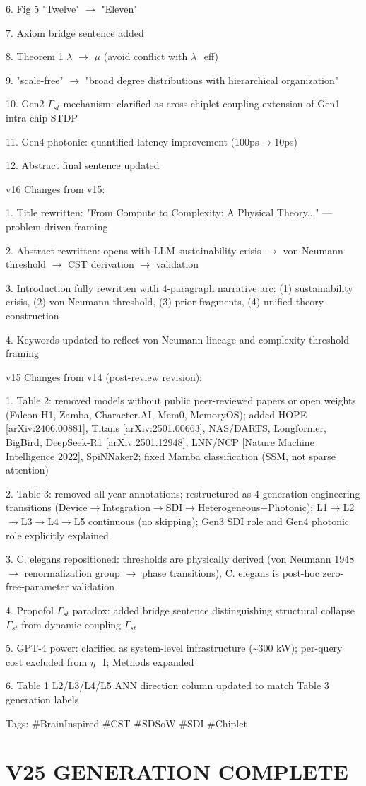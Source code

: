 \documentclass[a4paper,12pt]{article}
\begin{document}
6. Fig 5 "Twelve" $\rightarrow$ "Eleven"

7. Axiom bridge sentence added

8. Theorem 1 $\lambda$ $\rightarrow$ $\mu$ (avoid conflict with $\lambda$\_eff)

9. "scale-free" $\rightarrow$ "broad degree distributions with hierarchical organization"

10. Gen2 $\Gamma_{st}$ mechanism: clarified as cross-chiplet coupling extension of Gen1 intra-chip STDP

11. Gen4 photonic: quantified latency improvement (100ps$\rightarrow$10ps)

12. Abstract final sentence updated

v16 Changes from v15:

1. Title rewritten: "From Compute to Complexity: A Physical Theory..." --- problem-driven framing

2. Abstract rewritten: opens with LLM sustainability crisis $\rightarrow$ von Neumann threshold $\rightarrow$ CST derivation $\rightarrow$ validation

3. Introduction fully rewritten with 4-paragraph narrative arc: (1) sustainability crisis, (2) von Neumann threshold, (3) prior fragments, (4) unified theory construction

4. Keywords updated to reflect von Neumann lineage and complexity threshold framing

v15 Changes from v14 (post-review revision):

1. Table 2: removed models without public peer-reviewed papers or open weights (Falcon-H1, Zamba, Character.AI, Mem0, MemoryOS); added HOPE [arXiv:2406.00881], Titans [arXiv:2501.00663], NAS/DARTS, Longformer, BigBird, DeepSeek-R1 [arXiv:2501.12948], LNN/NCP [Nature Machine Intelligence 2022], SpiNNaker2; fixed Mamba classification (SSM, not sparse attention)

2. Table 3: removed all year annotations; restructured as 4-generation engineering transitions (Device$\rightarrow$Integration$\rightarrow$SDI$\rightarrow$Heterogeneous+Photonic); L1$\rightarrow$L2$\rightarrow$L3$\rightarrow$L4$\rightarrow$L5 continuous (no skipping); Gen3 SDI role and Gen4 photonic role explicitly explained

3. C. elegans repositioned: thresholds are physically derived (von Neumann 1948 $\rightarrow$ renormalization group $\rightarrow$ phase transitions), C. elegans is post-hoc zero-free-parameter validation

4. Propofol $\Gamma_{st}$ paradox: added bridge sentence distinguishing structural collapse $\Gamma_{st}$ from dynamic coupling $\Gamma_{st}$

5. GPT-4 power: clarified as system-level infrastructure (\textasciitilde{}300 kW); per-query cost excluded from $\eta$\_I; Methods expanded

6. Table 1 L2/L3/L4/L5 ANN direction column updated to match Table 3 generation labels

Tags: \#BrainInspired \#CST \#SDSoW \#SDI \#Chiplet

\section*{V25 GENERATION COMPLETE}
\end{document}
